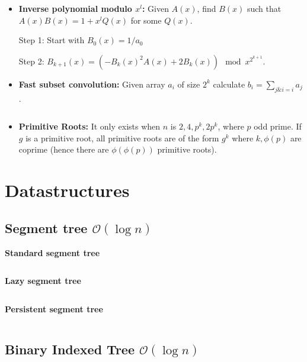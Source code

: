 \documentclass[8pt,a4paper,landscape,oneside]{amsart}
\newcommand{\mintedstyle}[2]{\inputminted[fontsize=\normalsize,baselinestretch=.9,breaklines,tabsize=2]{#1}{code/#2}}
\newcommand{\code}[1]{\mintedstyle{cpp}{#1}}
\newcommand*\BitAnd{\mathrel{\&}}
\newenvironment{myitemize}
{\begin{itemize}[leftmargin=.3cm]
	\setlength{\itemsep}{0pt}
	\setlength{\parskip}{0pt}
	\setlength{\parsep}{0pt}     }
{ \end{itemize}                  }
\begin{document}
\begin{multicols*}{3}
\begin{myitemize}
\item \textbf{Inverse polynomial modulo $x^l$:}
	Given $A(x)$, find $B(x)$ such that $A(x)B(x) = 1 + x^l Q(x)$ for some $Q(x)$.

	Step 1: Start with $B_0(x) = 1/a_0$

	Step 2: $B_{k+1}(x) = (-B_k(x)^2 A(x) + 2 B_k(x)) \mod x^{2^{k+1}}$.

\item \textbf{Fast subset convolution:}
	Given array $a_i$ of size $2^k$ calculate $b_i = \sum_{j \BitAnd i = i} a_j$.
	\code{math/subset_conv.cpp}

\item \textbf{Primitive Roots:}
	It only exists when $n$ is $2, 4, p^k, 2p^k$, where $p$ odd prime.
	If $g$ is a primitive root, all primitive roots are of the form $g^k$
	where $k,\phi(p)$ are coprime (hence there are $\phi(\phi(p))$ primitive roots).
\end{myitemize}

\section{Datastructures}
\subsection{Segment tree $\mathcal{O}(\log n)$}

\textbf{Standard segment tree}
\code{datastructures/segment_tree.cpp}

\textbf{Lazy segment tree}
\code{datastructures/lazy_segment_tree.cpp}

\textbf{Persistent segment tree}
\code{datastructures/persistent_segment_tree.cpp}

\subsection{Binary Indexed Tree $\mathcal{O}(\log n)$}


\end{multicols*}
\end{document}
